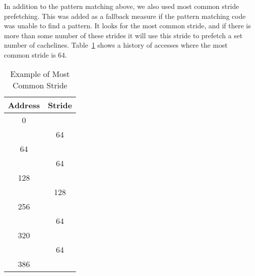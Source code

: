 In addition to the pattern matching above, we also used most common stride
prefetching. This was added as a fallback measure if the pattern matching code
was unable to find a pattern. It looks for the most common stride, and if there
is more than some number of these strides it will use this stride to prefetch a
set number of cachelines. Table~\ref{table:mcs} shows a history of accesses
where the most common stride is 64.
\begin{table}
	\caption{Example of Most Common Stride}
	\label{table:mcs}
	\begin{tabular}{c|c}
		\bfseries Address & \bfseries Stride\\
		\hline
		0   & \\
		    & 64\\
		64  & \\
		    & 64\\
		128 & \\
		    & 128\\
		256 & \\
		    & 64\\
		320 & \\
		    & 64\\
		386 & \\
	\end{tabular}
\end{table}
